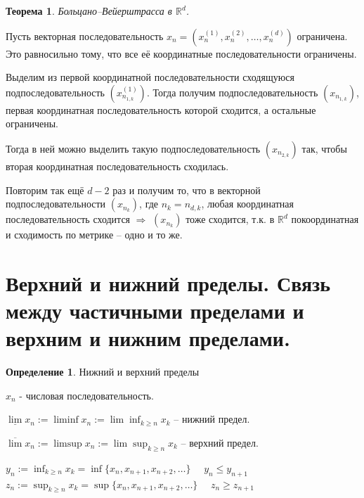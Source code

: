 \documentclass[12pt,letterpaper]{report}
\makeatletter
\newtheorem*{theorem-non}{Теорема}
\theoremstyle{definition}
\newtheorem*{conj}{Определение}
\renewenvironment{proof}[1][\proofname]{%
   \par\pushQED{\qed}\normalfont%
   \topsep6\p@\@plus6\p@\relax
   \trivlist\item[\hskip\labelsep\bfseries#1\@addpunct{.}]%
   \ignorespaces
}{%
   \popQED\endtrivlist\@endpefalse
}
\makeatother
\begin{document}
    \begin{theorem-non}
    Больцано–Вейерштрасса в $\mathbb{R}^d$.
    \end{theorem-non}
    \begin{proof}
    Пусть векторная последовательность
    $x_n = (x_n^{(1)}, x_n^{(2)}, \dots, x_n^{(d)})$ ограничена.
    Это равносильно тому, что все её координатные последовательности
    ограничены.
    
    Выделим из первой координатной последовательности сходящуюся
    подпоследовательность $(x_{n_{1, k}}^{(1)})$. Тогда получим
    подпоследовательность $(x_{n_{1, k}})$, первая координатная
    последовательность которой сходится, а остальные ограничены.
    
    Тогда в ней можно выделить такую подпоследовательность
    $(x_{n_{2, k}})$ так, чтобы вторая координатная последовательность
    сходилась.
    
    Повторим так ещё $d - 2$ раз и получим то, что в векторной 
    подпоследовательности $(x_{n_{k}})$, где $n_k = n_{d, k}$, 
    любая координатная последовательность сходится $\Rightarrow$
    $(x_{n_{k}})$ тоже сходится, т.к. в $\mathbb{R}^d$ покоординатная и
    сходимость по метрике -- одно и то же.
    
    \end{proof}
    
    
    \section{Верхний и нижний пределы. Связь между частичными пределами и  
    верхним и нижним пределами.}
    
    \begin{conj}
    Нижний и верхний пределы
    \end{conj}
    $x_n$ - числовая последовательность.
    
    $\underline{\lim} x_n := \liminf x_n := \lim \inf_{k \geq n} x_k$ -- 
    нижний предел.
    
    $\overline{\lim} x_n := \limsup x_n := \lim \sup_{k \geq n} x_k$ -- 
    верхний предел.
    
    $y_n := \inf_{k \geq n} x_k = \inf\{x_n, x_{n+1}, x_{n+2}, \dots\}$
    $\quad y_n \leq y_{n+1}$\\
    $z_n := \sup_{k \geq n} x_k = \sup\{x_n, x_{n+1}, x_{n+2}, \dots\}$
    $\quad z_n \geq z_{n+1}$
    
\end{document}
